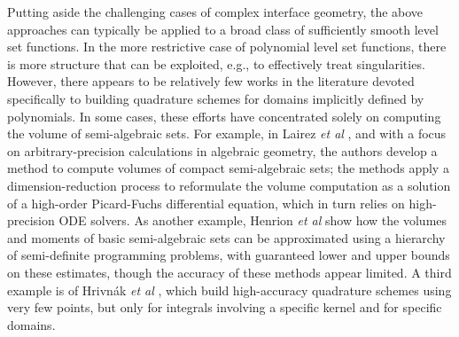 \documentclass[onefignum,onetabnum,onealgnum,oneeqnum]{siamart190516}
\begin{document}
\noindent Putting aside the challenging cases of complex interface geometry, the above approaches can typically be applied to a broad class of sufficiently smooth level set functions. In the more restrictive case of polynomial level set functions, there is more structure that can be exploited, e.g., to effectively treat singularities. However, there appears to be relatively few works in the literature devoted specifically to building quadrature schemes for domains implicitly defined by polynomials. In some cases, these efforts have concentrated solely on computing the volume of semi-algebraic sets. For example, in Lairez \textit{et al} \cite{10.1145/3326229.3326262}, and with a focus on arbitrary-precision calculations in algebraic geometry, the authors develop a method to compute volumes of compact semi-algebraic sets; the methods apply a dimension-reduction process to reformulate the volume computation as a solution of a high-order Picard-Fuchs differential equation, which in turn relies on high-precision ODE solvers. As another example, Henrion \textit{et al} \cite{doi:10.1137/080730287} show how the volumes and moments of basic semi-algebraic sets can be approximated using a hierarchy of semi-definite programming problems, with guaranteed lower and upper bounds on these estimates, though the accuracy of these methods appear limited. A third example is of Hrivn\'ak \textit{et al} \cite{Hrivn_k_2016}, which build high-accuracy quadrature schemes using very few points, but only for integrals involving a specific kernel and for specific domains.
\end{document}
